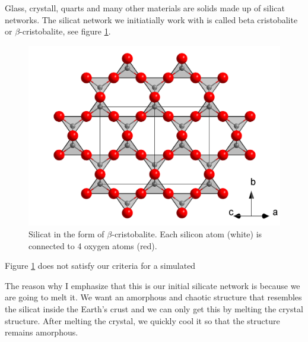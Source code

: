 \documentclass[10pt, a4paper]{report}
\begin{document}
Glass, crystall, quarts and many other materials are solids made up of silicat networks.
The silicat network we initiatially work with is called beta cristobalite or $\beta$-cristobalite, see figure \ref{fig:beta}.
\begin{figure}[h] 

 \includegraphics[scale=0.15]{beta.png}\centering
 \caption{\label{fig:beta}Silicat in the form of $\beta$-cristobalite. Each silicon atom (white) is connected to 4 oxygen atoms (red).}
 
\end{figure}
Figure \ref{fig:beta} does not satisfy our criteria for a simulated


The reason why I emphasize that this is our initial silicate network is because we are going to melt it.
We want an amorphous and chaotic structure that resembles the silicat inside the Earth's crust and we can only get this by melting the crystal structure.
After melting the crystal, we quickly cool it so that the structure remains amorphous.
\end{document}
